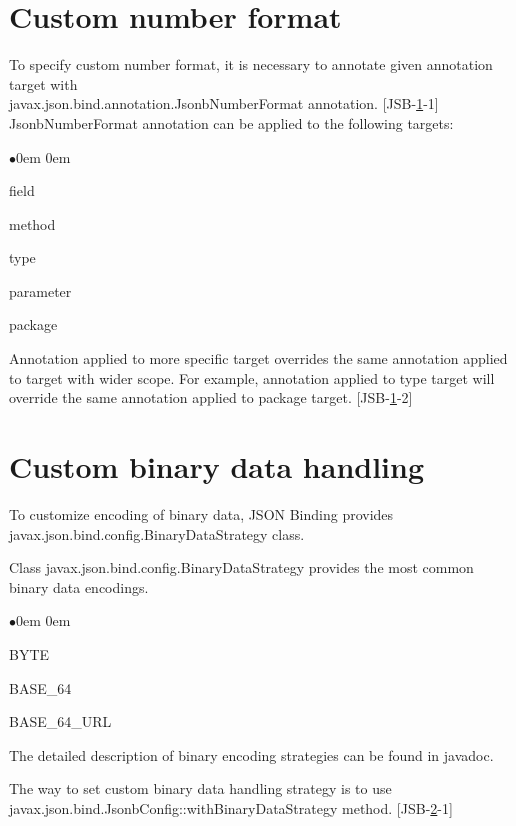 \section{Custom number format}
\label{sec:custom_number_format}

To specify custom number format, it is necessary to annotate given annotation target with \\ javax.json.bind.annotation.JsonbNumberFormat annotation. [JSB-\ref{sec:custom_number_format}-1] JsonbNumberFormat annotation can be applied to the following targets:

\begin{list}{$\bullet$}{\parsep 0em  0em}
\item field
\item method
\item type
\item parameter
\item package
\end{list}

Annotation applied to more specific target overrides the same annotation applied to target with wider scope. For example, annotation applied to type target will override the same annotation applied to package target. [JSB-\ref{sec:custom_number_format}-2]

\section{Custom binary data handling}
\label{sec:custom_binary_data}

To customize encoding of binary data, JSON Binding provides javax.json.bind.config.BinaryDataStrategy class.

Class javax.json.bind.config.BinaryDataStrategy provides the most common binary data encodings.

\begin{list}{$\bullet$}{\parsep 0em  0em}
\item BYTE
\item BASE\_64
\item BASE\_64\_URL
\end{list}

The detailed description of binary encoding strategies can be found in javadoc.

The way to set custom binary data handling strategy is to use javax.json.bind.JsonbConfig::withBinaryDataStrategy method. [JSB-\ref{sec:custom_binary_data}-1]